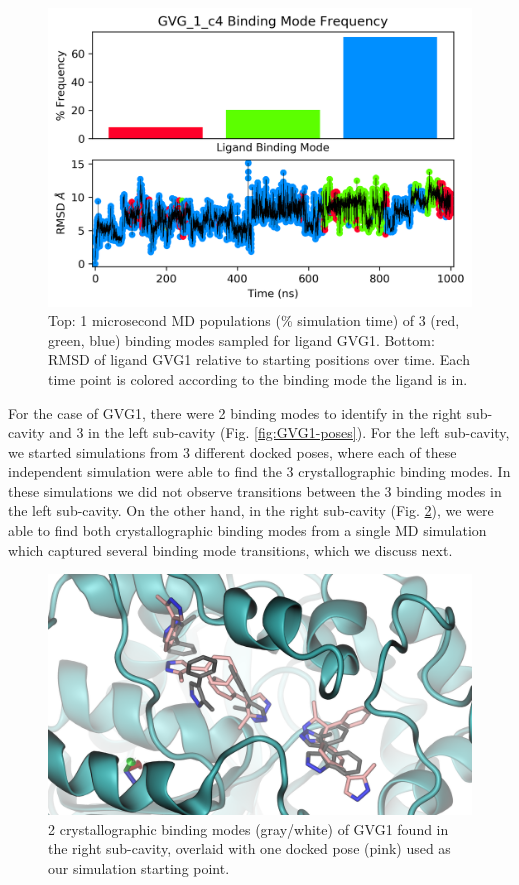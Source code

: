\begin{figure}
    \centering
    \includegraphics{chapter6/Figures/GVG_1_c4-md.png}
    \caption[GVG1 MD Populations]{Top: 1 microsecond MD populations (\% simulation time) of 3 (red, green, blue) binding modes sampled for ligand GVG1. Bottom: RMSD of ligand GVG1 relative to starting positions over time. Each time point is colored according to the binding mode the ligand is in.}
    \label{fig:GVG1_c4-md}
\end{figure}

For the case of GVG1, there were 2 binding modes to identify in the right sub-cavity and 3 in the left sub-cavity (Fig. \ref{fig:GVG1-poses}).
For the left sub-cavity, we started simulations from 3 different docked poses, where each of these independent simulation were able to find the 3 crystallographic binding modes.
In these simulations we did not observe transitions between the 3 binding modes in the left sub-cavity.
On the other hand, in the right sub-cavity (Fig. \ref{fig:GVG1-xtal}), we were able to find both crystallographic binding modes from a single MD simulation which captured several binding mode transitions, which we discuss next.

\begin{figure}
    \centering
    \includegraphics{chapter6/Figures/GVG_1-poses.png}
    \caption[GVG1 crystallographic binding modes]{2 crystallographic binding modes (gray/white) of GVG1 found in the right sub-cavity, overlaid with one docked pose (pink) used as our simulation starting point.}
    \label{fig:GVG1-xtal}
\end{figure}

